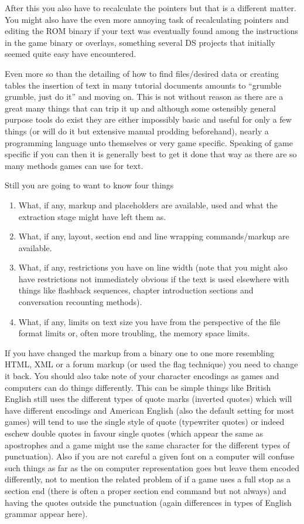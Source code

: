 \documentclass[
]{book}
\providecommand{\tightlist}{%
  \setlength{\itemsep}{0pt}\setlength{\parskip}{0pt}}
\begin{document}
After this you also have to recalculate the pointers but that is a different matter. You might also have the even more annoying task of recalculating pointers and editing the ROM binary if your text was eventually found among the instructions in the game binary or overlays, something several DS projects that initially seemed quite easy have encountered.

Even more so than the detailing of how to find files/desired data or creating tables the insertion of text in many tutorial documents amounts to ``grumble grumble, just do it'' and moving on. This is not without reason as there are a great many things that can trip it up and although some ostensibly general purpose tools do exist they are either impossibly basic and useful for only a few things (or will do it but extensive manual prodding beforehand), nearly a programming language unto themselves or very game specific. Speaking of game specific if you can then it is generally best to get it done that way as there are so many methods games can use for text.

Still you are going to want to know four things

\begin{enumerate}
\def\labelenumi{\arabic{enumi}.}
\tightlist
\item
  What, if any, markup and placeholders are available, used and what the extraction stage might have left them as.
\item
  What, if any, layout, section end and line wrapping commands/markup are available.
\item
  What, if any, restrictions you have on line width (note that you might also have restrictions not immediately obvious if the text is used elsewhere with things like flashback sequences, chapter introduction sections and conversation recounting methods).
\item
  What, if any, limits on text size you have from the perspective of the file format limits or, often more troubling, the memory space limits.
\end{enumerate}

If you have changed the markup from a binary one to one more resembling HTML, XML or a forum markup (or used the flag technique) you need to change it back. You should also take note of your character encodings as games and computers can do things differently. This can be simple things like British English still uses the different types of quote marks (inverted quotes) which will have different encodings and American English (also the default setting for most games) will tend to use the single style of quote (typewriter quotes) or indeed eschew double quotes in favour single quotes (which appear the same as apostrophes and a game might use the same character for the different types of punctuation). Also if you are not careful a given font on a computer will confuse such things as far as the on computer representation goes but leave them encoded differently, not to mention the related problem of if a game uses a full stop as a section end (there is often a proper section end command but not always) and having the quotes outside the punctuation (again differences in types of English grammar appear here).
\end{document}
